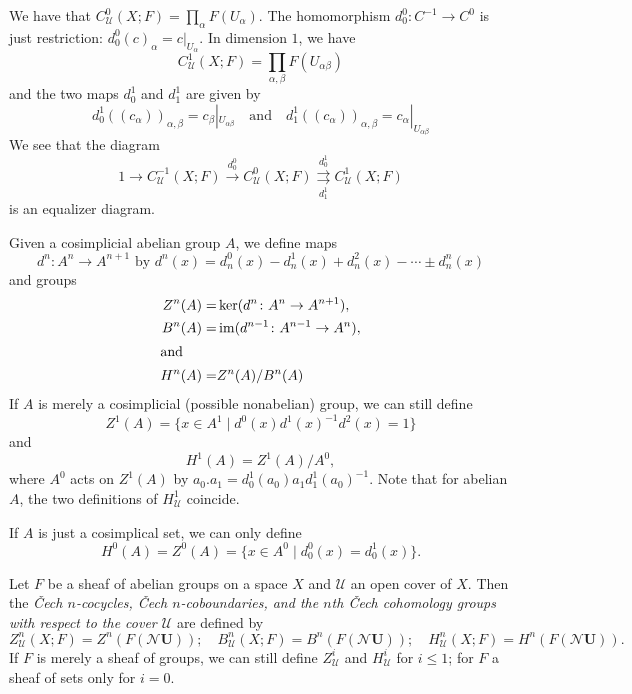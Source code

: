 \documentclass[a4paper,openany]{scrbook}
\newcommand{\nerve}{\mathcal N}
\begin{document}
\begin{example}
We have that $C^{0}_{\mathcal U}(X;F) = \prod_{\alpha} F(U_\alpha)$. The homomorphism $d^0_0\colon C^{-1} \to C^0$ is just restriction: $d^0_0(c)_{\alpha} = c|_{U_\alpha}$. In dimension $1$, we have
\[
C^1_{\mathcal U}(X;F) = \prod_{\alpha,\beta} F(U_{\alpha\beta})
\]
and the two maps $d^1_0$ and $d^1_1$ are given by
\[
d^1_0((c_\alpha))_{\alpha,\beta} = c_\beta|_{U_{\alpha\beta}} \quad \text{and} \quad d^1_1((c_\alpha))_{\alpha,\beta} = c_\alpha|_{U_{\alpha\beta}}
\]
We see that the diagram
\[
1 \to C^{-1}_{\mathcal U}(X;F) \xrightarrow{d^0_0} C^{0}_{\mathcal U}(X;F) \overset{d^1_0}{\underset{d^1_1}{\rightrightarrows}} C^1_{\mathcal U}(X;F)
\]
is an equalizer diagram.
\end{example}

\begin{defn}
Given a cosimplicial abelian group $A$, we define maps
\[
d^n\colon A^{n} \to A^{n+1} \text{ by } d^n(x) = d^0_n(x)-d^1_n(x)+d^2_n(x)-\cdots\pm d^n_n(x)
\]
and groups
\begin{align*}
Z^n(A) =& \ker(d^n\colon A^n \to A^{n+1}),\\
B^n(A) =& \operatorname{im}(d^{n-1}\colon A^{n-1} \to A^{n}),\\
\intertext{and}
H^n(A) =& Z^n(A)/B^n(A)
\end{align*}
If $A$ is merely a cosimplicial (possible nonabelian) group, we can still define
\[
Z^1(A) = \{x \in A^1 \mid d^0(x)d^1(x)^{-1}d^2(x)=1\}
\]
and
\[
H^1(A) = Z^1(A)/A^0,
\]
where $A^0$ acts on $Z^1(A)$ by $a_0.a_1 = d^1_0(a_0) a_1 d^1_1(a_0)^{-1}$. Note that for abelian $A$, the two definitions of $H^1_{\mathcal U}$ coincide.

If $A$ is just a cosimplical set, we can only define
\[
H^0(A) = Z^0(A) = \{x \in A^0 \mid d^0_0(x) = d^1_0(x)\}.
\]
\end{defn}

\begin{defn}
Let $F$ be a sheaf of abelian groups on a space $X$ and $\mathcal U$ an open cover of $X$. Then the \emph{Čech $n$-cocycles, Čech $n$-coboundaries, and the $n$th Čech cohomology groups with respect to the cover $\mathcal U$} are defined by
\[
Z^n_{\mathcal U}(X;F) = Z^n(F(\nerve \mathbf U)); \quad B^n_{\mathcal U}(X;F) = B^n(F(\nerve \mathbf U)); \quad H^n_{\mathcal U}(X;F) = H^n(F(\nerve \mathbf U)).
\]
If $F$ is merely a sheaf of groups, we can still define $Z^i_{\mathcal U}$ and $H^i_{\mathcal U}$ for $i \leq 1$; for $F$ a sheaf of sets only for $i=0$.
\end{defn}
\end{document}
